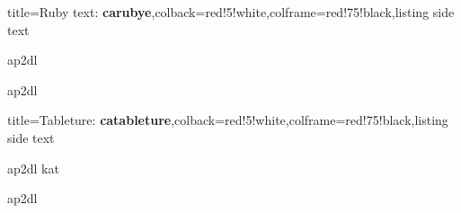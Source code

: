 \documentclass{article}
\begin{document}
\bigskip
\begin{tcblisting}{title={{\sffamily Ruby text: \bfseries\textcolor{blue!10}{carubye}}},colback=red!5!white,colframe=red!75!black,listing side text}
\begin{carubye}
ap2dl

ap2dl  


\end{carubye}
\end{tcblisting}

\bigskip
\begin{tcblisting}{title={{\sffamily Tableture: \bfseries\textcolor{blue!10}{catableture}}},colback=red!5!white,colframe=red!75!black,listing side text}
\begin{catableture}
ap2dl kat

ap2dl
\end{catableture}
\end{tcblisting}


\calists
\end{document}
